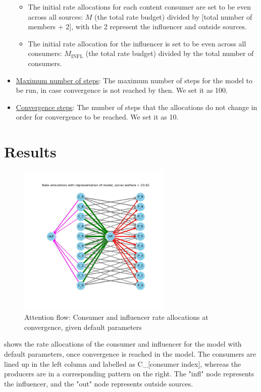 \documentclass[11pt, letterpaper]{article}
\begin{document}
\begin{itemize}
\begin{itemize}
        \item The initial rate allocations for each content consumer are set to be even across all sources: \(M\) (the total rate budget) divided by [total number of members + 2], with the 2 represent the influencer and outside sources.
        \item The initial rate allocation for the influencer is set to be even across all consumers: \(M_\text{INFL}\) (the total rate budget) divided by the total number of consumers.
    \end{itemize}
    \item \underline{Maximum number of steps}: The maximum number of steps for the model to be run, in case convergence is not reached by then. We set it as 100.
    \item \underline{Convergence steps}: The number of steps that the allocations do not change in order for convergence to be reached. We set it as 10.
\end{itemize}

\section{Results}

\begin{figure}[h]
    \centering
    \includegraphics[width=0.65\textwidth]{figures/default_allocs.jpg}
    \caption{Attention flow: Consumer and influencer rate allocations at convergence, given default parameters}
    \label{fig:default_allocs}
\end{figure}

 shows the rate allocations of the consumer and influencer for the model with default parameters, once convergence is reached in the model. The consumers are lined up in the left column and labelled as C\_[consumer index], whereas the producers are in a corresponding pattern on the right. The "infl" node represents the influencer, and the "out" node represents outside sources.
\end{document}
